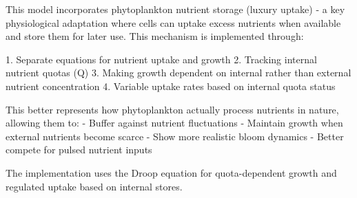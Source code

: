 This model incorporates phytoplankton nutrient storage (luxury uptake) - a key physiological adaptation where cells can uptake excess nutrients when available and store them for later use. This mechanism is implemented through:

1. Separate equations for nutrient uptake and growth
2. Tracking internal nutrient quotas (Q)
3. Making growth dependent on internal rather than external nutrient concentration
4. Variable uptake rates based on internal quota status

This better represents how phytoplankton actually process nutrients in nature, allowing them to:
- Buffer against nutrient fluctuations
- Maintain growth when external nutrients become scarce
- Show more realistic bloom dynamics
- Better compete for pulsed nutrient inputs

The implementation uses the Droop equation for quota-dependent growth and regulated uptake based on internal stores.
